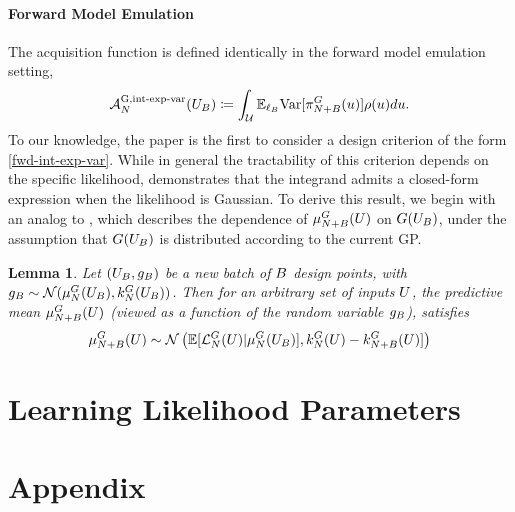 \documentclass[12pt]{article}
\newtheorem{lemma}{Lemma}
\begin{document}
\paragraph{Forward Model Emulation}
The acquisition function is defined identically in the forward model emulation setting, 
\begin{align}
\labelAcq[\Ndesign]{\fwdintExpVarLabel}(\designBatchIn) \Def
\int_{\parSpace} \E_{\designBatchLlik} \Var[\fwdEmRdm[\Naugment]{\postDens}(\Par)] \weightDens(\Par) d\Par. \label{fwd-int-exp-var}
\end{align}
To our knowledge, 
the paper \cite{SinsbeckNowak} is the first to consider a design criterion of the form \ref{fwd-int-exp-var}. 
While in general the tractability of this criterion depends on the specific likelihood, \cite{Surer2023sequential} 
demonstrates that the integrand admits a closed-form expression when the likelihood is Gaussian. 
To derive this result, we begin with an analog to , which describes the 
dependence of $\emMean[\Naugment]{\fwd}(\parMat)$ on $\fwd(\designBatchIn)$, under the assumption 
that $\fwd(\designBatchIn)$ is distributed according to the current GP. 
\begin{lemma} \label{lemma:fwd-pred-mean-dist}
Let $(\designBatchIn, \designBatchFwd)$ be a new batch of $\Nbatch$ design points, with 
$\designBatchFwd \sim \Gaussian(\emMean[\Ndesign]{\fwd}(\designBatchIn), \emKer[\Ndesign]{\fwd}(\designBatchIn))$. 
Then for an arbitrary set of inputs $\parMat$, the predictive mean $\emMean[\Naugment]{\fwd}(\parMat)$
(viewed as a function of the random variable $\designBatchFwd$), satisfies 
\begin{align}
\emMean[\Naugment]{\fwd}(\parMat) 
\sim \Gaussian\left(\E[\llikEmFwd[\Ndesign](\parMat) | \emMean[\Ndesign]{\fwd}(\designBatchIn)], 
                               \emKer[\Ndesign]{\fwd}(\parMat) - \emKer[\Naugment]{\fwd}(\parMat)] \right) \label{fwd-pred-mean-dist}
\end{align}
\end{lemma}


\section{Learning Likelihood Parameters} \label{section_lik_par}

\section{Appendix}
\end{document}
